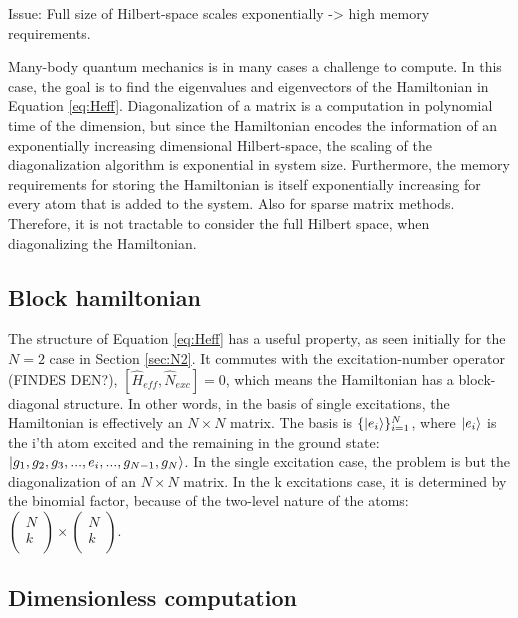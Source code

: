 \documentclass{article}
\begin{document}
Issue: Full size of Hilbert-space scales exponentially -> high memory requirements.

Many-body quantum mechanics is in many cases a challenge to compute. In this case, the goal is to find the eigenvalues and eigenvectors of the Hamiltonian in Equation \ref{eq:Heff}. Diagonalization of a matrix is a computation in polynomial time of the dimension, but since the Hamiltonian encodes the information of an exponentially increasing dimensional Hilbert-space, the scaling of the diagonalization algorithm is exponential in system size. Furthermore, the memory requirements for storing the Hamiltonian is itself exponentially increasing for every atom that is added to the system. Also for sparse matrix methods. Therefore, it is not tractable to consider the full Hilbert space, when diagonalizing the Hamiltonian. 

\subsection{Block hamiltonian}\label{sec:block}

The structure of Equation \ref{eq:Heff} has a useful property, as seen initially for the $N=2$ case in Section \ref{sec:N2}. It commutes with the excitation-number operator (FINDES DEN?), $[\hat{H}_{eff}, \hat{N}_{exc}] = 0$, which means the Hamiltonian has a block-diagonal structure. In other words, in the basis of single excitations, the Hamiltonian is effectively an $N \times N$ matrix. The basis is $\{ \ket{e_i} \}_{i=1}^N$, where $\ket{e_i}$ is the i'th atom excited and the remaining in the ground state: $\ket{g_1, g_2, g_3, ..., e_i, ..., g_{N-1}, g_N}$. In the single excitation case, the problem is but the diagonalization of an $N \times N$ matrix. In the k excitations case, it is determined by the binomial factor, because of the two-level nature of the atoms: $\begin{pmatrix} N \\ k \\ \end{pmatrix} \times \begin{pmatrix} N \\ k \\ \end{pmatrix}$.

\subsection{Dimensionless computation}\label{sec:dimless}
\end{document}
